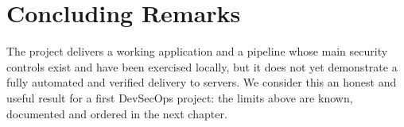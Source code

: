 \section{Concluding Remarks}

The project delivers a working application and a pipeline whose main security controls exist and have been exercised locally, but it does not yet demonstrate a fully automated and verified delivery to servers. We consider this an honest and useful result for a first DevSecOps project: the limits above are known, documented and ordered in the next chapter.
